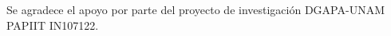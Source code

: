 
\begin{acknowledgements}

Se agradece el apoyo por parte del proyecto de investigación DGAPA-UNAM PAPIIT IN107122.

\end{acknowledgements}




